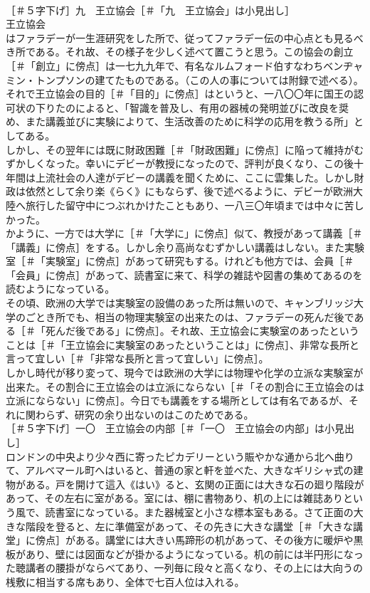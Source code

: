 \documentclass[8pt]{extreport}
\begin{document}
\begin{CJK}{UTF8}{min}
\\	［＃５字下げ］九　王立協会［＃「九　王立協会」は小見出し］
\\	王立協会
\\	はファラデーが一生涯研究をした所で、従ってファラデー伝の中心点とも見るべき所である。それ故、その様子を少しく述べて置こうと思う。この協会の創立［＃「創立」に傍点］は一七九九年で、有名なルムフォード伯すなわちベンヂャミン・トンプソンの建てたものである。（この人の事については附録で述べる）。
\\	それで王立協会の目的［＃「目的」に傍点］はというと、一八〇〇年に国王の認可状の下りたのによると、「智識を普及し、有用の器械の発明並びに改良を奨め、また講義並びに実験によりて、生活改善のために科学の応用を教うる所」としてある。
\\	しかし、その翌年には既に財政困難［＃「財政困難」に傍点］に陥って維持がむずかしくなった。幸いにデビーが教授になったので、評判が良くなり、この後十年間は上流社会の人達がデビーの講義を聞くために、ここに雲集した。しかし財政は依然として余り楽《らく》にもならず、後で述べるように、デビーが欧洲大陸へ旅行した留守中につぶれかけたこともあり、一八三〇年頃までは中々に苦しかった。
\\	かように、一方では大学に［＃「大学に」に傍点］似て、教授があって講義［＃「講義」に傍点］をする。しかし余り高尚なむずかしい講義はしない。また実験室［＃「実験室」に傍点］があって研究もする。けれども他方では、会員［＃「会員」に傍点］があって、読書室に来て、科学の雑誌や図書の集めてあるのを読むようになっている。
\\	その頃、欧洲の大学では実験室の設備のあった所は無いので、キャンブリッジ大学のごとき所でも、相当の物理実験室の出来たのは、ファラデーの死んだ後である［＃「死んだ後である」に傍点］。それ故、王立協会に実験室のあったということは［＃「王立協会に実験室のあったということは」に傍点］、非常な長所と言って宜しい［＃「非常な長所と言って宜しい」に傍点］。
\\	しかし時代が移り変って、現今では欧洲の大学には物理や化学の立派な実験室が出来た。その割合に王立協会のは立派にならない［＃「その割合に王立協会のは立派にならない」に傍点］。今日でも講義をする場所としては有名であるが、それに関わらず、研究の余り出ないのはこのためである。
\\	［＃５字下げ］一〇　王立協会の内部［＃「一〇　王立協会の内部」は小見出し］
\\	ロンドンの中央より少々西に寄ったピカデリーという賑やかな通から北へ曲りて、アルベマール町へはいると、普通の家と軒を並べた、大きなギリシャ式の建物がある。戸を開けて這入《はい》ると、玄関の正面には大きな石の廻り階段があって、その左右に室がある。室には、棚に書物あり、机の上には雑誌ありという風で、読書室になっている。また器械室と小さな標本室もある。さて正面の大きな階段を登ると、左に準備室があって、その先きに大きな講堂［＃「大きな講堂」に傍点］がある。講堂には大きい馬蹄形の机があって、その後方に暖炉や黒板があり、壁には図面などが掛かるようになっている。机の前には半円形になった聴講者の腰掛がならべてあり、一列毎に段々と高くなり、その上には大向うの桟敷に相当する席もあり、全体で七百人位は入れる。

\end{CJK}
\end{document}
